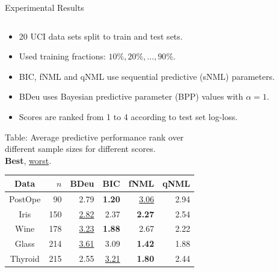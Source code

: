 \documentclass[final]{beamer}
\begin{document}
\begin{frame}{}
\begin{block}{Experimental Results}
\begin{columns}[T]
\begin{column}{0.55\textwidth}
    \vspace*{12pt}
	\begin{minipage}{0.3\textwidth}
	\vspace*{12pt}
	\begin{itemize}
	\item 20 UCI data sets split to train and test sets.
	\item Used training fractions: $10\%, 20\% , \ldots, 90\%$.
	\item BIC, fNML and qNML use sequential predictive (sNML) parameters.
	\item BDeu uses Bayesian predictive parameter (BPP) values with $\alpha = 1$. 
	\item Scores are ranked from 1 to 4 according to test set log-loss.
	\end{itemize}	
	\end{minipage}
	\begin{minipage}{0.35\textwidth}	
		\centering
		\tiny{
		\textcolor{HIITgreen}{Table:} Average predictive performance rank over \\ different sample sizes for different scores. \\ \textbf{Best}, \underline{worst}.    
	    \begin{table}
		\label{tbl:preds}
		\begin{center}
		\begin{tabular}{crrrrr}
		       Data
		    & $n$
		    & \multicolumn{1}{p{0.7cm}}{\centering BDeu}
		    & \multicolumn{1}{p{0.8cm}}{\centering BIC}
		    & \multicolumn{1}{p{0.9cm}}{\centering fNML}
		    & \multicolumn{1}{p{0.9cm}}{\centering qNML}\\
		       \midrule
		 PostOpe &     90 &              2.79 &     \textbf{1.20} &  \underline{3.06} &           2.94 \\
		    Iris &    150 &  \underline{2.82} &              2.37 &     \textbf{2.27} &           2.54 \\
		    Wine &    178 &  \underline{3.23} &     \textbf{1.88} &              2.67 &           2.22 \\
		   Glass &    214 &  \underline{3.61} &              3.09 &     \textbf{1.42} &           1.88 \\
		 Thyroid &    215 &              2.55 &  \underline{3.21} &     \textbf{1.80} &           2.44 \\

\end{tabular}
\end{center}
\end{table}}
\end{minipage}
\end{column}
\end{columns}
\end{block}
\end{frame}
\end{document}
